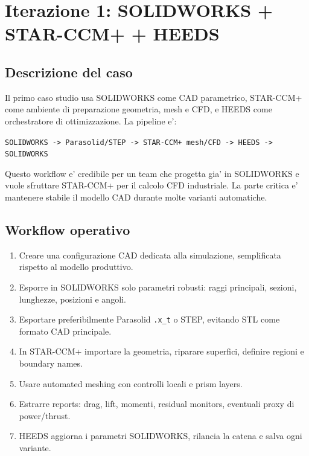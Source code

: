 
\chapter{Iterazione 1: SOLIDWORKS + STAR-CCM+ + HEEDS}
\label{cap:iter1-solidworks}

\section{Descrizione del caso}

Il primo caso studio usa SOLIDWORKS come CAD parametrico, STAR-CCM+ come ambiente di preparazione geometria, mesh e CFD, e HEEDS come orchestratore di ottimizzazione. La pipeline e':

\begin{center}
\texttt{SOLIDWORKS -> Parasolid/STEP -> STAR-CCM+ mesh/CFD -> HEEDS -> SOLIDWORKS}
\end{center}

Questo workflow e' credibile per un team che progetta gia' in SOLIDWORKS e vuole sfruttare STAR-CCM+ per il calcolo CFD industriale. La parte critica e' mantenere stabile il modello CAD durante molte varianti automatiche.

\section{Workflow operativo}

\begin{enumerate}
    \item Creare una configurazione CAD dedicata alla simulazione, semplificata rispetto al modello produttivo.
    \item Esporre in SOLIDWORKS solo parametri robusti: raggi principali, sezioni, lunghezze, posizioni e angoli.
    \item Esportare preferibilmente Parasolid \texttt{.x\_t} o STEP, evitando STL come formato CAD principale.
    \item In STAR-CCM+ importare la geometria, riparare superfici, definire regioni e boundary names.
    \item Usare automated meshing con controlli locali e prism layers.
    \item Estrarre reports: drag, lift, momenti, residual monitors, eventuali proxy di power/thrust.
    \item HEEDS aggiorna i parametri SOLIDWORKS, rilancia la catena e salva ogni variante.
\end{enumerate}

